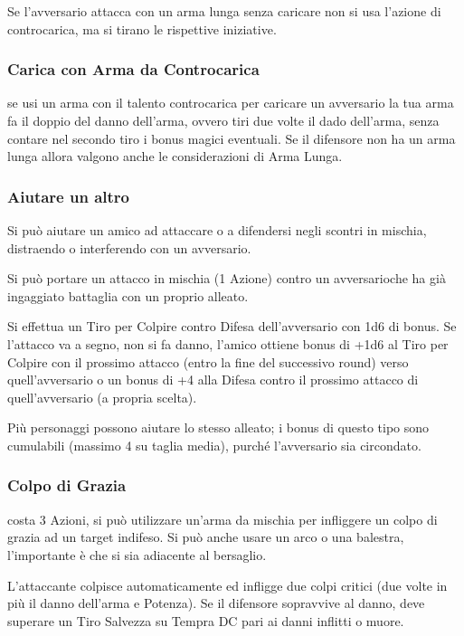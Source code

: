 \documentclass[a4paper,11pt,twoside,openany]{book}
\begin{document}
Se l'avversario attacca con un arma lunga senza caricare non si usa l'azione di controcarica, ma si tirano le rispettive iniziative.

\subsubsection{Carica con Arma da Controcarica} se usi un arma con il talento controcarica per caricare un avversario la tua arma fa il doppio del danno dell'arma, ovvero tiri due volte il dado dell'arma, senza contare nel secondo tiro i bonus magici eventuali. Se il difensore non ha un arma lunga allora valgono anche le considerazioni di Arma Lunga.

\subsubsection{Aiutare un altro} Si può aiutare un amico ad attaccare o a difendersi negli scontri in mischia, distraendo o interferendo con un avversario.

Si può portare un attacco in mischia (1 Azione) contro un avversarioche ha già ingaggiato battaglia con un proprio alleato.

Si effettua un Tiro per Colpire contro Difesa dell'avversario con 1d6 di bonus. Se l'attacco va a segno, non si fa danno, l'amico ottiene bonus di +1d6 al Tiro per Colpire con il prossimo attacco (entro la fine del successivo round) verso quell'avversario o un bonus di +4 alla Difesa contro il prossimo attacco di quell'avversario (a propria scelta).

Più personaggi possono aiutare lo stesso alleato; i bonus di questo tipo sono cumulabili (massimo 4 su taglia media), purché l'avversario sia circondato.

\subsubsection{Colpo di Grazia} costa 3 Azioni, si può utilizzare un'arma da mischia per infliggere un colpo di grazia ad un target indifeso. Si può anche usare un arco o una balestra, l'importante è che si sia adiacente al bersaglio.

L'attaccante colpisce automaticamente ed infligge due colpi critici (due volte in più il danno dell'arma e Potenza). Se il difensore sopravvive al danno, deve superare un Tiro Salvezza su Tempra DC pari ai danni inflitti o muore.
\end{document}
